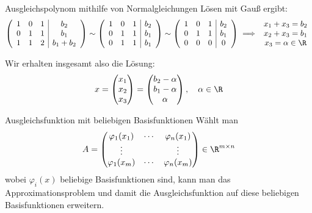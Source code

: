 \begin{example}{Ausgleichspolynom mithilfe von Normalgleichungen}
    Lösen mit Gauß ergibt:
    \[
        \left(
        \begin{array}{ccc|c}
                1 & 0 & 1 & b_2       \\
                0 & 1 & 1 & b_1       \\
                1 & 1 & 2 & b_1 + b_2
            \end{array}
        \right)
        \sim
        \left(
        \begin{array}{ccc|c}
                1 & 0 & 1 & b_2 \\
                0 & 1 & 1 & b_1 \\
                0 & 1 & 1 & b_1
            \end{array}
        \right)
        \sim
        \left(
        \begin{array}{ccc|c}
                1 & 0 & 1 & b_2 \\
                0 & 1 & 1 & b_1 \\
                0 & 0 & 0 & 0
            \end{array}
        \right)
        \implies
        \begin{array}{c}
            x_1 + x_3 = b_2 \\
            x_2 + x_3 = b_1 \\
            x_3 = \alpha \in \R
        \end{array}
    \]

    Wir erhalten insgesamt also die Lösung:
    \[
        x =
        \begin{pmatrix}
            x_1 \\
            x_2 \\
            x_3
        \end{pmatrix}
        =
        \begin{pmatrix}
            b_2 - \alpha \\
            b_1 - \alpha \\
            \alpha
        \end{pmatrix}
        , \quad \alpha \in \R
    \]
\end{example}

\begin{bonus}{Ausgleichsfunktion mit beliebigen Basisfunktionen}
    Wählt man
    \[
        A =
        \begin{pmatrix}
            \varphi_1(x_1) & \cdots & \varphi_n(x_1) \\
            \vdots         &        & \vdots         \\
            \varphi_1(x_m) & \cdots & \varphi_n(x_m)
        \end{pmatrix}
        \in \R^{m \times n}
    \]
    wobei $\varphi_i(x)$ beliebige Basisfunktionen sind, kann man das Approximationsproblem und damit die Ausgleichsfunktion auf diese beliebigen Basisfunktionen erweitern.
\end{bonus}

